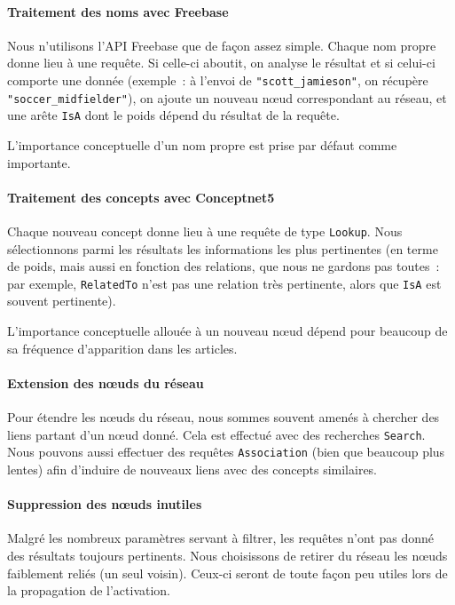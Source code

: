 \documentclass[a4paper, 12pt]{article}
\begin{document}
\paragraph{Traitement des noms avec Freebase}

Nous n'utilisons l'API Freebase que de fa\c{c}on assez simple. Chaque nom propre donne lieu à une requête. Si celle-ci aboutit, on analyse le résultat et si celui-ci comporte une donnée (exemple~: à l'envoi de \verb|"scott_jamieson"|, on récupère \verb|"soccer_midfielder"|), on ajoute un nouveau n\oe{}ud correspondant au réseau, et une arête \verb|IsA| dont le poids dépend du résultat de la requête.

L'importance conceptuelle d'un nom propre est prise par défaut comme importante.

\paragraph{Traitement des concepts avec Conceptnet5}

Chaque nouveau concept donne lieu à une requête de type \verb|Lookup|. Nous sélectionnons parmi les résultats les informations les plus pertinentes (en terme de poids, mais aussi en fonction des relations, que nous ne gardons pas toutes~: par exemple, \verb|RelatedTo| n'est pas une relation très pertinente, alors que \verb|IsA| est souvent pertinente).

L'importance conceptuelle allouée à un nouveau n\oe{}ud dépend pour beaucoup de sa fréquence d'apparition dans les articles.


\paragraph{Extension des nœuds du réseau}

Pour étendre les n\oe{}uds du réseau, nous sommes souvent amenés à chercher des liens partant d'un n\oe{}ud donné. Cela est effectué avec des recherches \verb|Search|. Nous pouvons aussi effectuer des requêtes \verb|Association| (bien que beaucoup plus lentes) afin d'induire de nouveaux liens avec des concepts similaires.



\paragraph{Suppression des nœuds inutiles}
Malgré les nombreux paramètres servant à filtrer, les requêtes n'ont pas donné des résultats toujours pertinents. Nous choisissons de retirer du réseau les nœuds faiblement reliés (un seul voisin). Ceux-ci seront de toute fa\c{c}on peu utiles lors de la propagation de l'activation.
\end{document}
